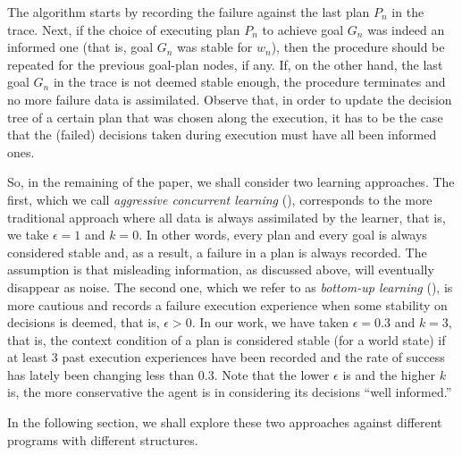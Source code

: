  
The algorithm starts by recording the failure against the last plan $P_n$ in the
trace.
Next, if the choice of executing plan $P_n$ to achieve goal $G_n$ was indeed an
informed one (that is, goal $G_n$ was stable for $w_n$), then the procedure
should be repeated for the previous goal-plan nodes, if any.
If, on the other hand, the last goal $G_n$ in the trace is not deemed stable
enough, the procedure terminates and no more failure data is assimilated.
Observe that, in order to update the decision tree of a certain plan that was
chosen along the execution, it has to be the case that the (failed) decisions
taken during execution must have all been informed ones.


So, in the remaining of the paper, we shall consider two learning approaches. The
first, which we call \emph{aggressive concurrent learning} (\CL), corresponds to
the more traditional approach where all data is always assimilated by the
learner, that is, we take $\epsilon = 1$ and $k = 0$. In other words, every plan
and every goal is always considered stable and, as a result, a failure in a plan
is always recorded. The assumption is that misleading information, as discussed
above, will eventually disappear as noise.
The second one, which we refer to as \emph{bottom-up learning} (\BUL), is more
cautious and records a failure execution experience when some stability on
decisions is deemed, that is, $\epsilon > 0$. In our work, we have taken
$\epsilon = 0.3$ and $k = 3$, that is, the context condition of a
plan is considered stable (for a world state) if at least $3$ past execution experiences 
have been recorded and the rate of success has lately been changing less than $0.3$.
Note that the lower $\epsilon$ is and the higher $k$ is, the more conservative
the agent is in considering its decisions ``well informed.''

In the following section, we shall explore these two approaches against
different programs with different structures.




